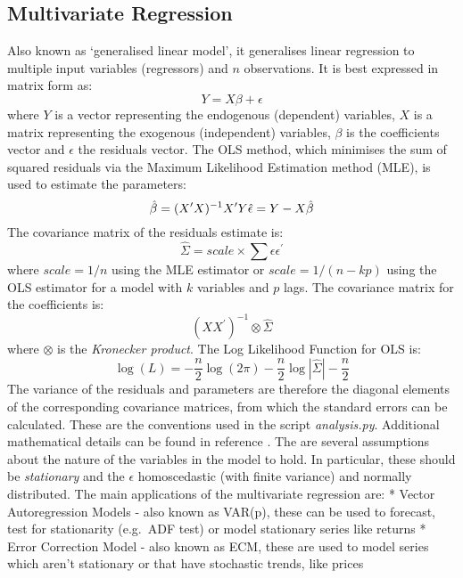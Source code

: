 \documentclass[11pt]{article}
\begin{document}
\begin{appendices}    
    
    \chapter{} \label{appendixA}
    
    \section{Multivariate Regression}\label{multivariate-regression}
    
Also known as `generalised linear model', it generalises linear
regression to multiple input variables (regressors) and \(n\)
observations. It is best expressed in matrix form as:
\begin{equation}
Y = X \beta + \epsilon
\end{equation}
where \(Y\) is a vector representing the endogenous (dependent)
variables, \(X\) is a matrix representing the exogenous (independent)
variables, \(\beta\) is the coefficients vector and \(\epsilon\) the
residuals vector.
The OLS method, which minimises the sum of squared residuals via the
Maximum Likelihood Estimation method (MLE), is used to estimate the
parameters:
\begin{equation}
\hat{\beta} = (X^\prime X)^{-1} X^\prime Y \\
\hat{\epsilon} = Y - X \hat{\beta}
\end{equation}
The covariance matrix of the residuals estimate is:
\begin{equation}
\hat{\Sigma} = scale \times  \sum \epsilon \epsilon^\prime
\end{equation} where \(scale = 1/ n\) using the MLE estimator or
\(scale= 1/ (n - kp)\) using the OLS estimator for a model with \(k\)
variables and \(p\) lags.
The covariance matrix for the coefficients is:
\begin{equation}
(X X^\prime)^{-1} \otimes \hat{\Sigma}
\end{equation} where \(\otimes\) is the \emph{Kronecker product}.
The Log Likelihood Function for OLS is:
\begin{equation}
\log(L) = -\frac{n}{2}\log (2 \pi) -\frac{n}{2}\log | \hat{\Sigma}| - \frac{n}{2}
\end{equation}
The variance of the residuals and parameters are therefore the diagonal
elements of the corresponding covariance matrices, from which the
standard errors can be calculated.
These are the conventions used in the script \emph{analysis.py}.
Additional mathematical details can be found in reference \cite{wikiVAR}.
The are several assumptions about the nature of the variables in the
model to hold. In particular, these should be \emph{stationary} and the
\(\epsilon\) homoscedastic (with finite variance) and normally
distributed.
The main applications of the multivariate regression are: * Vector
Autoregression Models - also known as VAR(p), these can be used to
forecast, test for stationarity (e.g.~ADF test) or model stationary
series like returns * Error Correction Model - also known as ECM, these
are used to model series which aren't stationary or that have stochastic
trends, like prices



\end{appendices}
\end{document}
